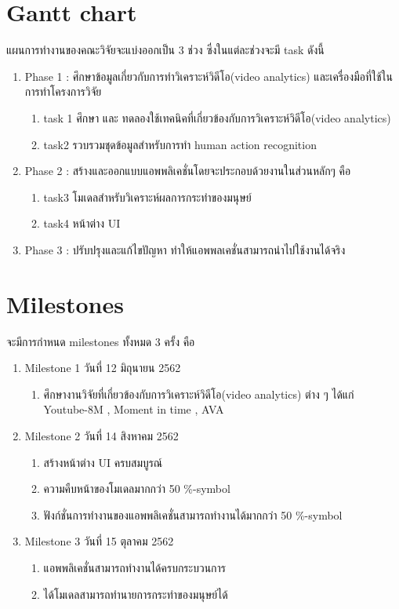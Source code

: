 \section{Gantt chart}แผนการทำงานของคณะวิจัยจะแบ่งออกเป็น 3 ช่วง ซึ่งในแต่ละช่วงจะมี task ดังนี้
\begin{enumerate}
	\item Phase 1 :  ศึกษาข้อมูลเกี่ยวกับการทำวิเคราะห์วิดีโอ(video analytics) และเครื่องมือที่ใช้ในการทำโครงการวิจัย
		\begin{enumerate}\setlength\itemsep{-0.25em}
			\item task 1 	ศึกษา และ ทดลองใช้เทคนิคที่เกี่ยวข้องกับการวิเคราะห์วิดีโอ(video analytics)
			\item task2	รวบรวมชุดข้อมูลสำหรับการทำ human action recognition
		\end{enumerate}
	\item Phase 2 :  สร้างและออกแบบแอพพลิเคชั่นโดยจะประกอบด้วยงานในส่วนหลักๆ คือ
		\begin{enumerate}\setlength\itemsep{-0.25em}
			\item task3	โมเดลสำหรับวิเคราะห์ผลการกระทำของมนุษย์
			\item task4	หน้าต่าง UI
		\end{enumerate}
	\item Phase 3 : ปรับปรุงและแก้ไขปัญหา ทำให้แอพพลเคชั่นสามารถนำไปใช้งานได้จริง
\end{enumerate}

\section{Milestones}จะมีการกำหนด milestones ทั้งหมด 3 ครั้ง คือ
\begin{enumerate}
	\item Milestone  1  วันที่ 12  มิถุนายน  2562
		\begin{enumerate}\setlength\itemsep{-0.25em}
			\item ศึกษางานวิจัยที่เกี่ยวข้องกับการวิเคราะห์วิดีโอ(video analytics) ต่าง ๆ  ได้แก่ Youtube-8M , Moment in time , AVA
		\end{enumerate}
	\item Milestone  2  วันที่ 14  สิงหาคม 2562
		\begin{enumerate}\setlength\itemsep{-0.25em}
			\item สร้างหน้าต่าง UI ครบสมบูรณ์
			\item ความคืบหน้าของโมเดลมากกว่า 50 \%-symbol
			\item ฟังก์ชั่นการทำงานของแอพพลิเคชั่นสามารถทำงานได้มากกว่า 50 \%-symbol
		\end{enumerate}
	\item Milestone  3  วันที่ 15  ตุลาคม 2562
		\begin{enumerate}\setlength\itemsep{-0.25em}
			\item แอพพลิเคชั่นสามารถทำงานได้ครบกระบวนการ
			\item ได้โมเดลสามารถทำนายการกระทำของมนุษย์ได้
		\end{enumerate}
\end{enumerate}



